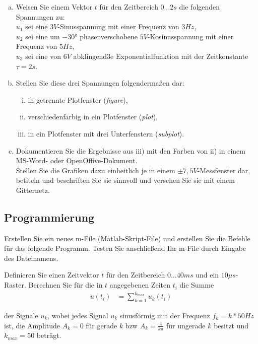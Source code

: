 \begin{enumerate}[a)]
    \item Weisen Sie einem Vektor $t$ für den Zeitbereich $0 \dots 2s$ die folgenden Spannungen zu:\\
    $u_1$ sei eine $3V$-Sinusspannung mit einer Frequenz von $3Hz$,\\
    $u_2$ sei eine um $-30\textrm{°}$ phasenverschobene $5V$-Kosinusspannung mit einer Frequenz von $5 Hz$,\\
    $u_3$ sei eine von $6V$ abklingend3e Exponentialfunktion mit der Zeitkonstante $\tau = 2s$.
    \item Stellen Sie diese drei Spannungen folgendermaßen dar:
    \begin{enumerate}[i)]
        \item in getrennte Plotfenster (\emph{figure}),
        \item verschiedenfarbig in ein Plotfenster (\emph{plot}),
        \item in ein Plotfenster mit drei Unterfenstern (\emph{subplot}).
    \end{enumerate}
    \item Dokumentieren Sie die Ergebnisse aus iii) mit den Farben von ii) in einem MS-Word- oder OpenOffive-Dokument.\\
    Stellen Sie die Grafiken dazu einheitlich je in einem $\pm7,5V$-Messfenster dar, betiteln und beschriften Sie sie sinnvoll und versehen Sie sie mit einem Gitternetz.
\end{enumerate}

\subsection{Programmierung}

Erstellen Sie ein neues m-File (Matlab-Skript-File) und erstellen Sie die Befehle für das folgende Programm. Testen Sie anschließend Ihr m-File durch Eingabe des Dateinamens.

Definieren Sie einen Zeitvektor $t$ für den Zeitbereich $0 \dots 40ms$ und ein $10\mu s$-Raster. Berechnen Sie für die in $t$ angegebenen Zeiten $t_i$ die Summe
\begin{align*}
    u(t_i) &= \sum_{k=1}^{k_{max}} u_k (t_i)
\end{align*}

der Signale $u_k$, wobei jedes Signal $u_k$ sinusförmig mit der Frequenz $f_k = k*50Hz$ ist, die Amplitude $A_k = 0$ für gerade $k$ bzw $A_k = \frac{4}{k\pi}$ für ungerade $k$ besitzt und $k_{max} = 50$ beträgt.

